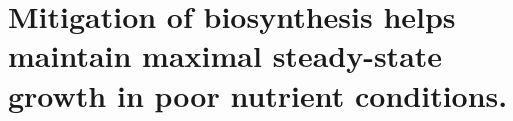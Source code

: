 




%

\section{Mitigation of biosynthesis helps maintain maximal steady-state growth
in poor nutrient conditions.}

